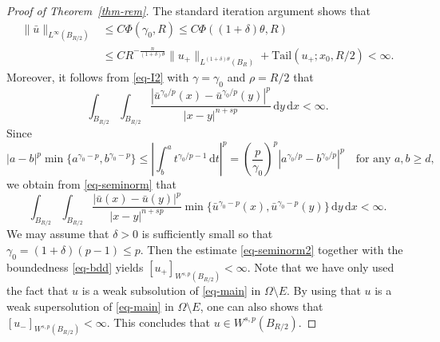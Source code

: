 \documentclass[11pt]{amsart}
\theoremstyle{plain}
\theoremstyle{definition}
\numberwithin{equation}{section}
\begin{document}
\begin{proof}[Proof of Theorem~\ref{thm-rem}]
The standard iteration argument shows that
\begin{equation}\label{eq-bdd}
\begin{split}
\|\bar{u}\|_{L^\infty(B_{R/2})}
&\leq C \Phi(\gamma_0, R) \leq C \Phi((1+\delta)\theta, R) \\
&\leq C R^{-\frac{n}{(1+\delta)\theta}} \|u_+\|_{L^{(1+\delta)\theta}(B_{R})} + \mathrm{Tail}(u_+; x_0, R/2) < \infty.
\end{split}
\end{equation}
Moreover, it follows from \eqref{eq-I2} with $\gamma=\gamma_0$ and $\rho=R/2$ that
\begin{equation}\label{eq-seminorm}
\int_{B_{R/2}} \int_{B_{R/2}} \frac{|\bar{u}^{\gamma_0/p}(x) - \bar{u}^{\gamma_0/p}(y)|^p}{|x-y|^{n+sp}} \,\mathrm{d}y \,\mathrm{d}x < \infty.
\end{equation}
Since
\begin{equation*}
|a-b|^p \min\{ a^{\gamma_0-p}, b^{\gamma_0-p} \} \leq \left| \int_b^a t^{\gamma_0/p-1} \,\mathrm{d}t \right|^p = \left( \frac{p}{\gamma_0} \right)^p \left|a^{\gamma_0/p} - b^{\gamma_0/p} \right|^p \quad\text{for any }a, b \geq d,
\end{equation*}
we obtain from \eqref{eq-seminorm} that
\begin{equation}\label{eq-seminorm2}
\int_{B_{R/2}} \int_{B_{R/2}} \frac{|\bar{u}(x) - \bar{u}(y)|^p}{|x-y|^{n+sp}} \min\{ \bar{u}^{\gamma_0-p}(x), \bar{u}^{\gamma_0-p}(y) \}\,\mathrm{d}y \,\mathrm{d}x < \infty.
\end{equation}
We may assume that $\delta>0$ is sufficiently small so that $\gamma_0=(1+\delta)(p-1) \leq p$. Then the estimate \eqref{eq-seminorm2} together with the boundedness \eqref{eq-bdd} yields $[u_+]_{W^{s, p}(B_{R/2})} < \infty$. Note that we have only used the fact that $u$ is a weak subsolution of \eqref{eq-main} in $\Omega \setminus E$. By using that $u$ is a weak supersolution of \eqref{eq-main} in $\Omega \setminus E$, one can also shows that $[u_-]_{W^{s, p}(B_{R/2})} < \infty$. This concludes that $u \in W^{s, p}(B_{R/2})$.


\end{proof}
\end{document}

